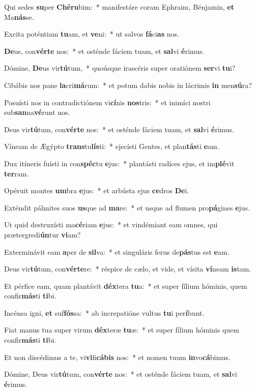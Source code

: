 \item Qui sedes \textbf{su}per \textbf{Ché}\textbf{ru}bim:~* manifestáre coram Ephraim, Bénjamin, \textbf{et} Ma\textbf{nás}se.
\item Excita poténtiam \textbf{tu}am, et \textbf{ve}ni:~* ut salvos \textbf{fá}ci\textbf{as} nos.
\item \textbf{De}us, con\textbf{vér}\textbf{te} nos:~* et osténde fáciem tuam, et \textbf{sal}vi \textbf{é}rimus.
\item Dómine, \textbf{De}us vir\textbf{tú}tum,~* quoúsque irascéris super oratiónem \textbf{ser}vi \textbf{tu}i?
\item Cibábis nos pane \textbf{la}cri\textbf{má}rum:~* et potum dabis nobis in lácrimis \textbf{in} men\textbf{sú}ra?
\item Posuísti nos in contradictiónem vi\textbf{cí}nis \textbf{nos}tris:~* et inimíci nostri sub\textbf{san}na\textbf{vé}runt nos.
\item Deus vir\textbf{tú}tum, con\textbf{vér}\textbf{te} nos:~* et osténde fáciem tuam, et \textbf{sal}vi \textbf{é}rimus.
\item Víneam de Ægýpto \textbf{trans}tu\textbf{lís}ti:~* ejecísti Gentes, et plan\textbf{tás}ti \textbf{e}am.
\item Dux itíneris fuísti in con\textbf{spéc}tu \textbf{e}jus:~* plantásti radíces ejus, et im\textbf{plé}vit \textbf{ter}ram.
\item Opéruit montes \textbf{um}bra \textbf{e}jus:~* et arbústa ejus \textbf{ce}dros \textbf{De}i.
\item Exténdit pálmites suos \textbf{us}que ad \textbf{ma}re:~* et usque ad flumen pro\textbf{pá}gines \textbf{e}jus.
\item Ut quid destruxísti ma\textbf{cé}riam \textbf{e}jus:~* et vindémiant eam omnes, qui prætergredi\textbf{ún}tur \textbf{vi}am?
\item Exterminávit eam \textbf{a}per de \textbf{sil}va:~* et singuláris ferus de\textbf{pás}tus est \textbf{e}am.
\item Deus vir\textbf{tú}tum, con\textbf{vér}\textbf{te}re:~* réspice de cælo, et vide, et vísita \textbf{ví}neam \textbf{is}tam.
\item Et pérfice eam, quam plantávit \textbf{déx}tera \textbf{tu}a:~* et super fílium hóminis, quem confir\textbf{más}ti \textbf{ti}bi.
\item Incénsa igni, \textbf{et} suf\textbf{fós}sa:~* ab increpatióne vultus \textbf{tu}i per\textbf{í}bunt.
\item Fiat manus tua super virum \textbf{déx}teræ \textbf{tu}æ:~* et super fílium hóminis quem confir\textbf{más}ti \textbf{ti}bi.
\item Et non discédimus a te, vi\textbf{vi}fi\textbf{cá}\textbf{bis} nos:~* et nomen tuum \textbf{in}vo\textbf{cá}bimus.
\item Dómine, Deus vir\textbf{tú}tum, con\textbf{vér}\textbf{te} nos:~* et osténde fáciem tuam, et \textbf{sal}vi \textbf{é}rimus.
